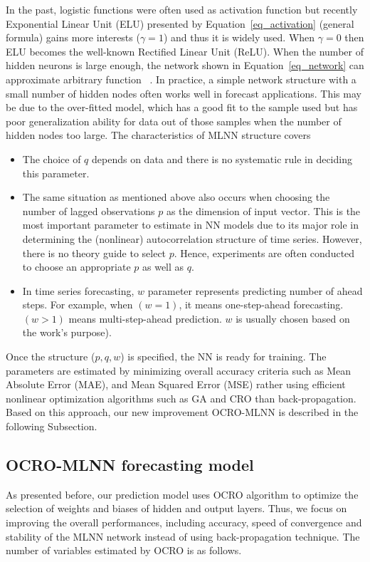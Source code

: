 \documentclass[smallcondensed, natbib]{svjour3}     %
\def \TN#1{\textcolor{gn_green}{~#1}}			%
\begin{document}
In the past, logistic functions were often used as activation function but recently Exponential Linear Unit (ELU) presented by Equation~\ref{eq_activation} (general formula) gains more interests ($\gamma = 1$) and thus it is widely used. 
When $\gamma = 0$ then ELU becomes the well-known Rectified Linear Unit (ReLU). %
When the number of hidden neurons is large enough, the network shown in Equation~\ref{eq_network} can approximate arbitrary function ~\citep{ref_hornik}. In practice, a simple network structure with a small number of hidden nodes often works well in forecast applications. This may be due to the over-fitted model, which has a good fit to the sample used but has poor generalization ability for data out of those samples when the number of hidden nodes too large. The characteristics of MLNN structure covers 

\begin{itemize}
	\item The choice of $q$ depends on data and there is no systematic rule in deciding this parameter. 
	\item The same situation as mentioned above also occurs when choosing the number of lagged observations $p$ as the dimension of input vector. This is the most important parameter to estimate in NN models due to its major role in determining the (nonlinear) autocorrelation structure of time series. However, there is no theory guide to select $p$. Hence, experiments are often conducted to choose an appropriate $p$ as well as $q$. 
	\item In time series forecasting, $w$ parameter represents predicting number of ahead steps. For example, when $(w=1)$, it means one-step-ahead forecasting. $(w>1)$ means multi-step-ahead prediction. $w$ is usually chosen based on the work's purpose).  
\end{itemize}

Once the structure ($p, q, w$) is specified, the NN is ready for training. 
The parameters are estimated by minimizing overall accuracy criteria such as Mean Absolute Error (MAE), and Mean Squared Error (MSE) rather using efficient nonlinear optimization algorithms such as GA and CRO than back-propagation. Based on this approach, our new improvement OCRO-MLNN is described in the following Subsection.

\subsection{OCRO-MLNN forecasting model}
\label{ocro_mlnn_model}
As presented before, our prediction model uses OCRO algorithm to optimize the selection of weights and biases of hidden and output layers. Thus, we focus on improving the overall performances, including accuracy, speed of convergence and stability of the MLNN network instead of using back-propagation technique. The number of variables estimated by OCRO is as follows.
\end{document}
